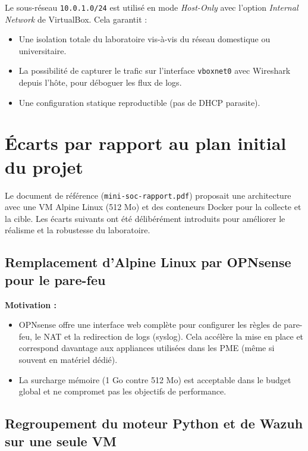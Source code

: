 \documentclass[12pt,a4paper]{article}
\begin{document}
Le sous-réseau \texttt{10.0.1.0/24} est utilisé en mode \textit{Host-Only} avec l'option \textit{Internal Network} de VirtualBox. Cela garantit :
\begin{itemize}
    \item Une isolation totale du laboratoire vis-à-vis du réseau domestique ou universitaire.
    \item La possibilité de capturer le trafic sur l'interface \texttt{vboxnet0} avec Wireshark depuis l'hôte, pour déboguer les flux de logs.
    \item Une configuration statique reproductible (pas de DHCP parasite).
\end{itemize}

\section{Écarts par rapport au plan initial du projet}
\label{sec:ecarts}

Le document de référence (\texttt{mini-soc-rapport.pdf}) proposait une architecture avec une VM Alpine Linux (512 Mo) et des conteneurs Docker pour la collecte et la cible. Les écarts suivants ont été délibérément introduits pour améliorer le réalisme et la robustesse du laboratoire.

\subsection{Remplacement d'Alpine Linux par OPNsense pour le pare-feu}

\textbf{Motivation :}
\begin{itemize}
    \item OPNsense offre une interface web complète pour configurer les règles de pare-feu, le NAT et la redirection de logs (syslog). Cela accélère la mise en place et correspond davantage aux appliances utilisées dans les PME (même si souvent en matériel dédié).
    \item La surcharge mémoire (1 Go contre 512 Mo) est acceptable dans le budget global et ne compromet pas les objectifs de performance.
\end{itemize}

\subsection{Regroupement du moteur Python et de Wazuh sur une seule VM}
\end{document}
